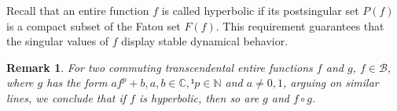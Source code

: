 \documentclass[a4paper,12pt]{amsart}
\newcommand{\C}{\mathbb{C}}
\newcommand{\N}{\mathbb{N}}
\numberwithin{equation}{section}
\newtheorem{remark}[theorem]{Remark}
\newtheorem{definition}[theorem]{Definition}
\begin{document}
	

		Recall that an entire function $f$ is called hyperbolic if its postsingular set $P(f)$ is a compact subset of the Fatou set $F(f)$. This requirement guarantees that the singular values of $f$ display stable dynamical behavior.
%	
%	
		\begin{remark}
		For two commuting transcendental entire functions $f$ and $g$, $f\in \mathcal{B}$, where $g$ has the form $af^p+b, a,b \in \C,¹ p\in \N$ and $a\neq 0,1$, arguing on similar lines, we conclude that if $f$ is hyperbolic, then so are $g$ and $f \circ g$.
		\end{remark}
\end{document}
